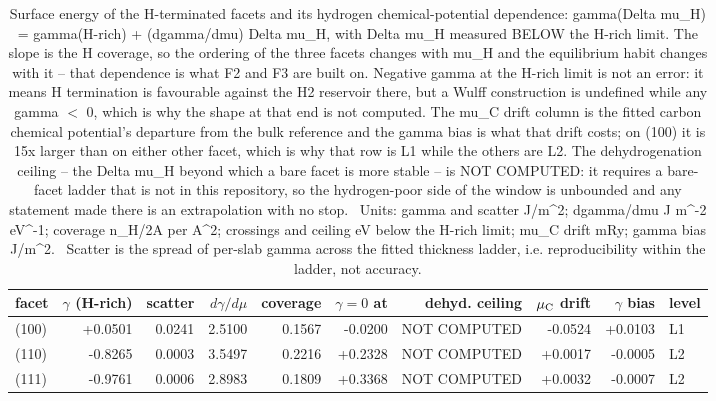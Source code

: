 \begin{table}[htbp]
  \centering
  \caption{Surface energy of the H-terminated facets and its hydrogen chemical-potential dependence: gamma(Delta mu\_H) = gamma(H-rich) + (dgamma/dmu) Delta mu\_H, with Delta mu\_H measured BELOW the H-rich limit. The slope is the H coverage, so the ordering of the three facets changes with mu\_H and the equilibrium habit changes with it -- that dependence is what F2 and F3 are built on. Negative gamma at the H-rich limit is not an error: it means H termination is favourable against the H2 reservoir there, but a Wulff construction is undefined while any gamma $<$ 0, which is why the shape at that end is not computed. The mu\_C drift column is the fitted carbon chemical potential's departure from the bulk reference and the gamma bias is what that drift costs; on (100) it is 15x larger than on either other facet, which is why that row is L1 while the others are L2. The dehydrogenation ceiling -- the Delta mu\_H beyond which a bare facet is more stable -- is NOT COMPUTED: it requires a bare-facet ladder that is not in this repository, so the hydrogen-poor side of the window is unbounded and any statement made there is an extrapolation with no stop. \textbullet\ Units: gamma and scatter J/m\textasciicircum{}2; dgamma/dmu J m\textasciicircum{}-2 eV\textasciicircum{}-1; coverage n\_H/2A per A\textasciicircum{}2; crossings and ceiling eV below the H-rich limit; mu\_C drift mRy; gamma bias J/m\textasciicircum{}2. \textbullet\ Scatter is the spread of per-slab gamma across the fitted thickness ladder, i.e. reproducibility within the ladder, not accuracy.}
  \label{tab:t3-surface-energies}
  \begin{tabular}{lrrrrrrrrl}
    \toprule
    facet & $\gamma$ (H-rich) & scatter & $d\gamma/d\mu$ & coverage & $\gamma=0$ at & dehyd. ceiling & $\mu_{\rm C}$ drift & $\gamma$ bias & level \\
    \midrule
    (100) & +0.0501 & 0.0241 & 2.5100 & 0.1567 & -0.0200 & NOT COMPUTED & -0.0524 & +0.0103 & L1 \\
    (110) & -0.8265 & 0.0003 & 3.5497 & 0.2216 & +0.2328 & NOT COMPUTED & +0.0017 & -0.0005 & L2 \\
    (111) & -0.9761 & 0.0006 & 2.8983 & 0.1809 & +0.3368 & NOT COMPUTED & +0.0032 & -0.0007 & L2 \\
    \bottomrule
  \end{tabular}
\end{table}
